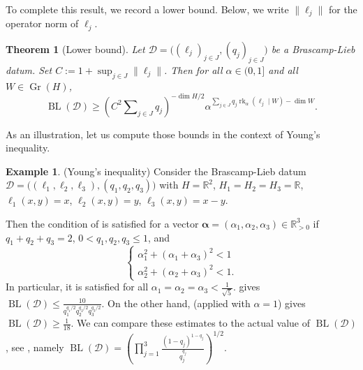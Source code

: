 \documentclass[a4paper,english]{amsart}
\newtheorem{thm}{Theorem}[section]
\theoremstyle{definition}
\newtheorem*{example}{Example}
\newcommand{\R}{\mathbb{R}}
\newcommand{\bba}{\boldsymbol{\alpha}}
\newcommand{\1}{\mathbbm{1}}
\newcommand{\sD} {{\mathscr D}}
\DeclareMathOperator{\rk}{rk}
\DeclareMathOperator{\Gr}{Gr}
\DeclareMathOperator{\BL}{BL}
\begin{document}
To complete this result, we record a lower bound. Below, we write $\|\ell_{j}\|$ for the operator norm of $\ell_{j}$.
\begin{thm}[Lower bound] \label{thm:lb}
Let $\sD = \bigl((\ell_j)_{j \in J}, (q_j)_{j \in J}\bigr)$ be a Brascamp-Lieb datum.  Set $C:=1+\sup_{j\in J} \|\ell_{j}\|$.
Then for all $\alpha \in (0, 1]$ and all $W \in \Gr(H)$,
\[
\BL(\sD) \geq \left(C^2\sum\nolimits_{j \in J} q_j \right)^{-\dim H / 2}  \alpha^{\sum_{j \in J} q_j \rk_{\alpha}(\ell_j \mid W) - \dim W}.
\]
\end{thm}
\bigskip

As an illustration, let us compute  those bounds in the context of Young's inequality.
\begin{example}
(Young's inequality)
Consider the Brascamp-Lieb datum $\sD = \bigl( (\ell_1, \ell_2, \ell_3), (q_1, q_2, q_3) \bigr)$ with $H = \R^2$, $H_1 = H_2 = H_3 = \R$,  $\ell_1(x,y) = x$, $\ell_2(x,y) = y$, $\ell_3(x,y) = x - y$.

Then the condition of  is satisfied for a vector $\bba=(\alpha_1, \alpha_2, \alpha_3) \in \R_{> 0}^3$ if
$q_1 + q_2 + q_3 = 2$,  $0 < q_1, q_2, q_3 \leq 1$, and
\[
\left\{
\begin{array}{l}
\alpha_1^2 + (\alpha_1 + \alpha_3)^2 < 1 \\
\alpha_2^2 + (\alpha_2 + \alpha_3)^2 < 1.
\end{array}
\right.
\]
In particular, it is satisfied for all $\alpha_1 = \alpha_2 = \alpha_3 < \frac{1}{\sqrt{5}}$.
 gives $\BL(\sD) \leq \frac{10}{q_1^{q_1/2}q_2^{q_2/2}q_3^{q_3/2}}$.
On the other hand,  (applied with $\alpha=1$) gives $\BL(\sD) \geq \frac{1}{18}$.
We can compare these estimates to the actual value of $\BL(\sD)$, see \cite[Example 1.5]{BCCT08}, namely $\BL(\sD)= \left(\prod_{j=1}^3 \frac{(1 - q_j)^{1 - q_j}}{q_j^{q_j}}\right)^{1/2}$.
\end{example}
\bigskip
\end{document}
